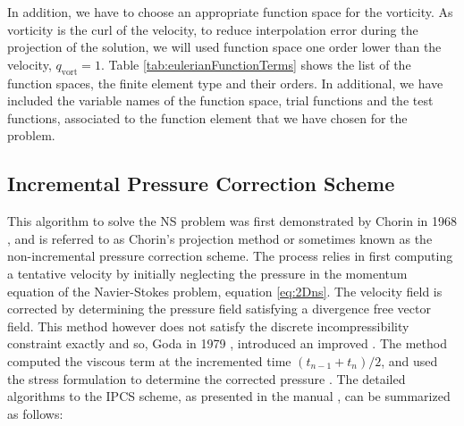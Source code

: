 
In addition, we have to choose an appropriate function space for the vorticity. As vorticity is the curl of the velocity, to reduce interpolation error during the projection of the solution, we will used function space one order lower than the velocity, $q_{\mathrm{vort}} = 1$. Table \ref{tab:eulerianFunctionTerms} shows the list of the function spaces, the finite element type and their orders. In additional, we have included the variable names of the function space, trial functions and the test functions, associated to the function element that we have chosen for the problem.



\subsection{Incremental Pressure Correction Scheme}
\label{subsec:ipcs}
This algorithm to solve the NS problem was first demonstrated by Chorin in 1968 \cite{Chorin1968}, and is referred to as Chorin's projection method or sometimes known as the non-incremental pressure correction scheme. The process relies in first computing a tentative velocity by initially neglecting the pressure in the momentum equation of the Navier-Stokes problem, equation \ref{eq:2Dns}. The velocity field is corrected by determining the pressure field satisfying a divergence free vector field. This method however does not satisfy the discrete incompressibility constraint exactly and so, Goda in 1979 \cite{Goda1979a}, introduced an improved . The method computed the viscous term at the incremented time $(t_{n-1} + t_n)/2$, and used the stress formulation to determine the corrected pressure \cite{Logg2012b}. The detailed algorithms to the IPCS scheme, as presented in the \fenics manual \cite{Logg2012b}, can be summarized as follows:

